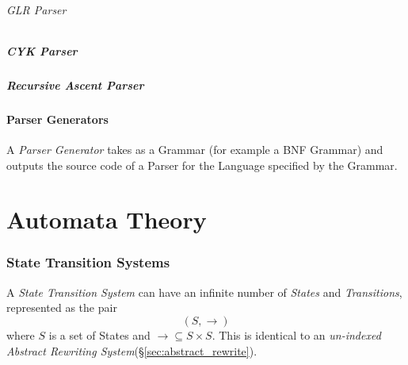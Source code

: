 \documentclass{article}
\begin{document}
\paragraph{GLR Parser}

\subsubsection{CYK Parser}

\subsubsection{Recursive Ascent Parser}

\subsection{Parser Generators}\label{subsec:parser_generator}

A \emph{Parser Generator} takes as a Grammar (for example a BNF
Grammar) and outputs the source code of a Parser for the Language
specified by the Grammar.



\part{Automata Theory}\label{sec:automata_theory}

\section{State Transition Systems} \label{sec:state_transition_system}

A \emph{State Transition System} can have an infinite number of
\emph{States} and \emph{Transitions}, represented as the pair
\[
    (S,\rightarrow)
\]
where $S$ is a set of States and $\rightarrow \subseteq S \times S$.
This is identical to an \emph{un-indexed Abstract Rewriting
  System}(\S\ref{sec:abstract_rewrite}).
\end{document}
